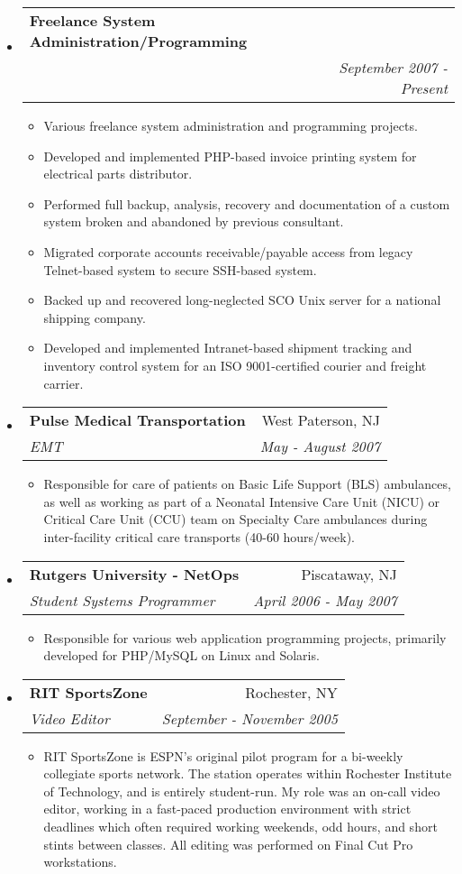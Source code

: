 \documentclass[letterpaper,11pt]{article}
\makeatletter
\newcommand{\resitem}[1]{\item #1 \vspace{-2pt}}
\newcommand{\ressubheading}[4]{
\begin{tabular*}{7.0in}{l@{\extracolsep{\fill}}r}
		\textbf{#1} & #2 \\
		\textit{#3} & \textit{#4} \\
\end{tabular*}\vspace{-6pt}}
\makeatother
\begin{document}
\begin{itemize}
\item
        \ressubheading{Freelance System Administration/Programming}{ }{ }{September 2007 - Present}
        \begin{itemize}
               \resitem{Various freelance system administration and
                 programming projects.}
               \resitem{Developed and implemented PHP-based invoice printing
                 system for electrical parts distributor.}
               \resitem{Performed full backup, analysis, recovery and documentation of a
                 custom system broken and abandoned by previous consultant.}
               \resitem{Migrated corporate accounts receivable/payable access
                 from legacy Telnet-based system to secure SSH-based system.}
               \resitem{Backed up and recovered long-neglected SCO Unix server
                 for a national shipping company.}
               \resitem{Developed and implemented Intranet-based shipment tracking and
                 inventory control system for an ISO 9001-certified courier
                 and freight carrier.}
        \end{itemize}
\pagebreak
\item
        \ressubheading{Pulse Medical Transportation}{West Paterson, NJ}{EMT}{May - August 2007}
        \begin{itemize}
                \resitem{Responsible for care of patients on Basic Life
                  Support (BLS) ambulances, as well as working as part of a
                  Neonatal Intensive Care Unit (NICU) or Critical Care Unit
                  (CCU) team on Specialty Care
                  ambulances during inter-facility critical care transports
                  (40-60 hours/week).}
        \end{itemize}

\item
	\ressubheading{Rutgers University - NetOps}{Piscataway, NJ}{Student Systems Programmer}{April 2006 - May 2007}
	\begin{itemize}
		\resitem{Responsible for various web application programming projects, primarily developed for
                  PHP/MySQL on Linux and Solaris.}
	\end{itemize}

\item
        \ressubheading{RIT SportsZone}{Rochester, NY}{Video Editor}{September - November 2005}
        \begin{itemize}
                \resitem{RIT SportsZone is ESPN’s original pilot program for a
                bi-weekly collegiate sports network. The station operates
                within Rochester Institute of Technology, and is entirely
                student-run. My role was an on-call video editor, working in a
                fast-paced production environment with strict deadlines which
                often required working weekends, odd hours, and short stints
                between classes. All editing was performed on Final Cut Pro
                workstations. }
        \end{itemize}


\end{itemize}
\end{document}

